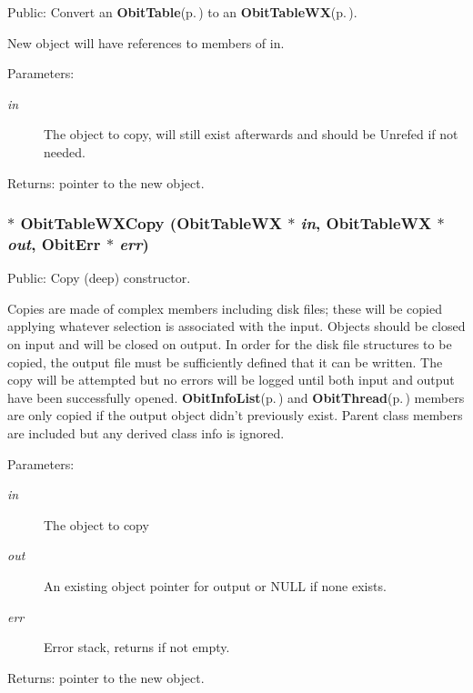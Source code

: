 Public: Convert an {\bf Obit\-Table}{\rm (p.\,\pageref{structObitTable})} to an {\bf Obit\-Table\-WX}{\rm (p.\,\pageref{structObitTableWX})}. 

New object will have references to members of in. \begin{Desc}
\item[Parameters:]
\begin{description}
\item[{\em in}]The object to copy, will still exist afterwards and should be Unrefed if not needed. \end{description}
\end{Desc}
\begin{Desc}
\item[Returns:]pointer to the new object. \end{Desc}
\subsubsection{$\ast$ Obit\-Table\-WXCopy ({\bf Obit\-Table\-WX} $\ast$ {\em in}, {\bf Obit\-Table\-WX} $\ast$ {\em out}, {\bf Obit\-Err} $\ast$ {\em err})}\label{ObitTableWX_8h_a14}


Public: Copy (deep) constructor. 

Copies are made of complex members including disk files; these will be copied applying whatever selection is associated with the input. Objects should be closed on input and will be closed on output. In order for the disk file structures to be copied, the output file must be sufficiently defined that it can be written. The copy will be attempted but no errors will be logged until both input and output have been successfully opened. {\bf Obit\-Info\-List}{\rm (p.\,\pageref{structObitInfoList})} and {\bf Obit\-Thread}{\rm (p.\,\pageref{structObitThread})} members are only copied if the output object didn't previously exist. Parent class members are included but any derived class info is ignored. \begin{Desc}
\item[Parameters:]
\begin{description}
\item[{\em in}]The object to copy \item[{\em out}]An existing object pointer for output or NULL if none exists. \item[{\em err}]Error stack, returns if not empty. \end{description}
\end{Desc}
\begin{Desc}
\item[Returns:]pointer to the new object. \end{Desc}
